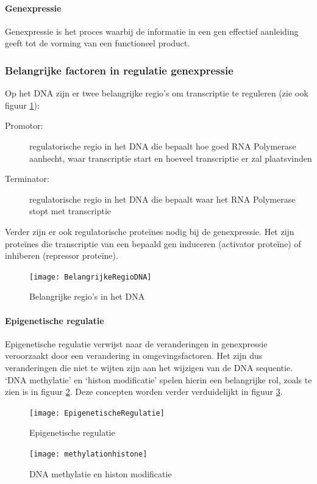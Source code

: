 \documentclass[a4paper,kul]{kulakarticle} %
\begin{document}
\paragraph{Genexpressie}
Genexpressie is het proces waarbij de informatie in een gen effectief aanleiding geeft tot de vorming van een functioneel product. 
\subsubsection{Belangrijke factoren in regulatie genexpressie}
Op het DNA zijn er twee belangrijke regio's om transcriptie te reguleren (zie ook figuur \ref{fig:belangrijkeregiodna}):
\begin{description}
	\item[Promotor:] regulatorische regio in het DNA die bepaalt hoe goed RNA Polymerase aanhecht, waar transcriptie start en hoeveel transcriptie er zal plaatsvinden
	\item[Terminator:] regulatorische regio in het DNA die bepaalt waar het RNA Polymerase stopt met transcriptie
\end{description} 
Verder zijn er ook regulatorische proteïnes nodig bij de genexpressie. Het zijn proteïnes die transcriptie van een bepaald gen induceren (activator proteïne) of inhiberen (repressor proteïne).
\begin{figure}[h]
	\centering
	\texttt{[image: BelangrijkeRegioDNA]}
	\caption[Belangrijke regio DNA]{Belangrijke regio's in het DNA}
	\label{fig:belangrijkeregiodna}
\end{figure}
\newpage
\paragraph{Epigenetische regulatie}
Epigenetische regulatie verwijst naar de veranderingen in genexpressie veroorzaakt door een verandering in omgevingsfactoren. Het zijn dus veranderingen die niet te wijten zijn aan het wijzigen van de DNA sequentie. `DNA methylatie' en `histon modificatie' spelen hierin een belangrijke rol, zoals te zien is in figuur \ref{fig:epigenetischeregulatie}. Deze concepten worden verder verduidelijkt in figuur \ref{fig:methylationhistone}.
\begin{figure}[h]
	\centering
	\texttt{[image: EpigenetischeRegulatie]}
	\caption[Epigenetische regulatie]{Epigenetische regulatie}
	\label{fig:epigenetischeregulatie}
\end{figure}
\begin{figure}[h]
	\centering
	\texttt{[image: methylationhistone]}
	\caption[DNA methylatie en histon modificatie]{DNA methylatie en histon modificatie}
	\label{fig:methylationhistone}
\end{figure}
\end{document}
